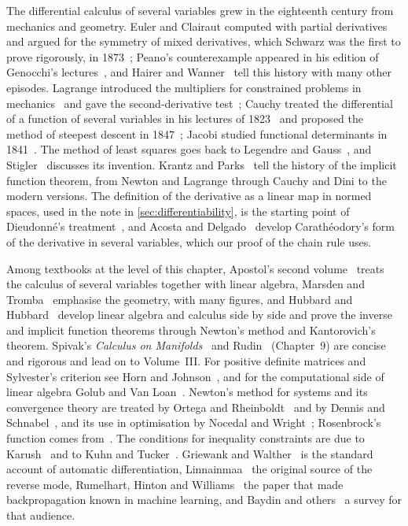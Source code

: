 The differential calculus of several variables grew in the eighteenth century from mechanics and geometry. Euler and Clairaut computed with partial derivatives and argued for the symmetry of mixed derivatives, which Schwarz was the first to prove rigorously, in 1873~\cite{schwarz1873}; Peano's counterexample appeared in his edition of Genocchi's lectures~\cite{genocchi1884}, and Hairer and Wanner~\cite{hairer1996analysis} tell this history with many other episodes. Lagrange introduced the multipliers for constrained problems in mechanics~\cite{lagrange1788} and gave the second-derivative test~\cite{lagrange1797}; Cauchy treated the differential of a function of several variables in his lectures of 1823~\cite{cauchy1823} and proposed the method of steepest descent in 1847~\cite{cauchy1847}; Jacobi studied functional determinants in 1841~\cite{jacobi1841}. The method of least squares goes back to Legendre and Gauss~\cite{legendre1805,gauss1809}, and Stigler~\cite{stigler1981} discusses its invention. Krantz and Parks~\cite{krantz2002ift} tell the history of the implicit function theorem, from Newton and Lagrange through Cauchy and Dini to the modern versions. The definition of the derivative as a linear map in normed spaces, used in the note in \cref{sec:differentiability}, is the starting point of Dieudonn\'e's treatment~\cite{dieudonne1960}, and Acosta and Delgado~\cite{acosta1994} develop Carath\'eodory's form of the derivative in several variables, which our proof of the chain rule uses.

Among textbooks at the level of this chapter, Apostol's second volume~\cite{apostol1969calculus} treats the calculus of several variables together with linear algebra, Marsden and Tromba~\cite{marsden2012vector} emphasise the geometry, with many figures, and Hubbard and Hubbard~\cite{hubbard2015vector} develop linear algebra and calculus side by side and prove the inverse and implicit function theorems through Newton's method and Kantorovich's theorem. Spivak's \emph{Calculus on Manifolds}~\cite{spivak1965manifolds} and Rudin~\cite{rudin1976} (Chapter~9) are concise and rigorous and lead on to Volume~III. For positive definite matrices and Sylvester's criterion see Horn and Johnson~\cite{horn2013}, and for the computational side of linear algebra Golub and Van Loan~\cite{golub2013}. Newton's method for systems and its convergence theory are treated by Ortega and Rheinboldt~\cite{ortega2000} and by Dennis and Schnabel~\cite{dennis1996}, and its use in optimisation by Nocedal and Wright~\cite{nocedal2006}; Rosenbrock's function comes from~\cite{rosenbrock1960}. The conditions for inequality constraints are due to Karush~\cite{karush1939} and to Kuhn and Tucker~\cite{kuhn1951}. Griewank and Walther~\cite{griewank2008} is the standard account of automatic differentiation, Linnainmaa~\cite{linnainmaa1976} the original source of the reverse mode, Rumelhart, Hinton and Williams~\cite{rumelhart1986} the paper that made backpropagation known in machine learning, and Baydin and others~\cite{baydin2018} a survey for that audience.

\chapterreferences
